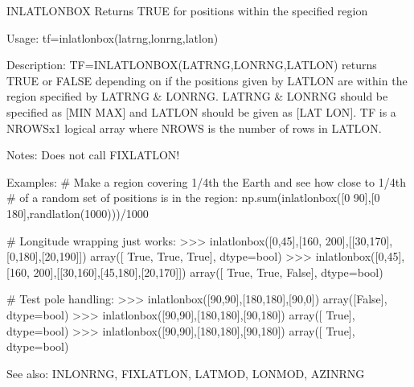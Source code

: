 \documentclass[letterpaper,10pt,english]{sphinxmanual}
\begin{document}

\begin{fulllineitems}
\label{\detokenize{infrapy.utils:infrapy.utils.latlon.inlatlonbox}}
INLATLONBOX    Returns TRUE for positions within the specified region

Usage:    tf=inlatlonbox(latrng,lonrng,latlon)

Description:
TF=INLATLONBOX(LATRNG,LONRNG,LATLON) returns TRUE or FALSE depending
on if the positions given by LATLON are within the region specified
by LATRNG \& LONRNG.  LATRNG \& LONRNG should be specified as {[}MIN MAX{]}
and LATLON should be given as {[}LAT LON{]}.  TF is a NROWSx1 logical
array where NROWS is the number of rows in LATLON.

Notes:
\sphinxhyphen{} Does not call FIXLATLON!

Examples:
\# Make a region covering 1/4th the Earth and see how close to 1/4th
\# of a random set of positions is in the region:
np.sum(inlatlonbox({[}0 90{]},{[}0 180{]},randlatlon(1000)))/1000

\# Longitude wrapping just works:
\textgreater{}\textgreater{}\textgreater{} inlatlonbox({[}0,45{]},{[}160, 200{]},{[}{[}30,\sphinxhyphen{}170{]},{[}0,\sphinxhyphen{}180{]},{[}20,190{]}{]})
array({[} True,  True,  True{]}, dtype=bool)
\textgreater{}\textgreater{}\textgreater{} inlatlonbox({[}0,45{]},{[}160, 200{]},{[}{[}30,\sphinxhyphen{}160{]},{[}45,180{]},{[}\sphinxhyphen{}20,\sphinxhyphen{}170{]}{]})
array({[} True,  True, False{]}, dtype=bool)

\# Test pole handling:
\textgreater{}\textgreater{}\textgreater{} inlatlonbox({[}90,90{]},{[}180,180{]},{[}90,0{]})
array({[}False{]}, dtype=bool)
\textgreater{}\textgreater{}\textgreater{} inlatlonbox({[}90,90{]},{[}180,180{]},{[}90,180{]})
array({[} True{]}, dtype=bool)
\textgreater{}\textgreater{}\textgreater{} inlatlonbox({[}90,90{]},{[}180,180{]},{[}90,\sphinxhyphen{}180{]})
array({[} True{]}, dtype=bool)

See also: INLONRNG, FIXLATLON, LATMOD, LONMOD, AZINRNG

\end{fulllineitems}

\end{document}
